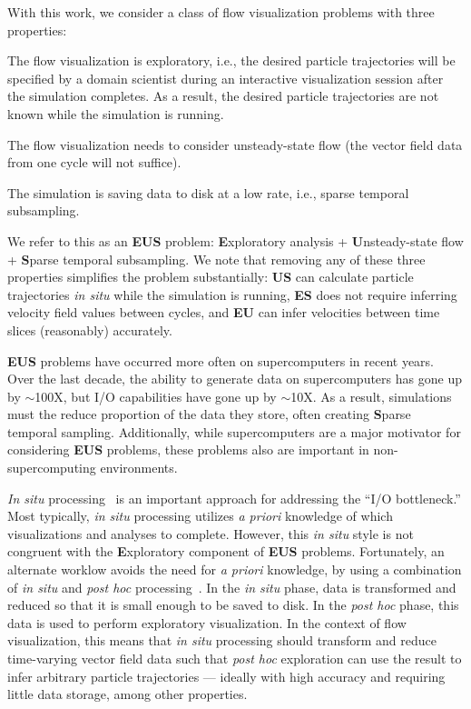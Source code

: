 With this work, we consider a class of flow visualization problems with three properties:
\begin{tightEnumerate}
\item The flow visualization is exploratory, i.e., the desired particle trajectories will 
be specified by a domain scientist during an interactive visualization session after the simulation completes.  
As a result, the desired particle trajectories are not known while the simulation is running.
\item The flow visualization needs to consider unsteady-state flow (the vector field data from one cycle will not suffice).
\item The simulation is saving data to disk at a low rate, i.e., sparse temporal subsampling.
\end{tightEnumerate}
%
We refer to this as an \textbf{EUS} problem: 
\textbf{E}xploratory analysis
+ 
\textbf{U}nsteady-state flow 
+ 
\textbf{S}parse temporal subsampling.
%
We note that removing any of these three properties simplifies the problem substantially:
\textbf{US} can calculate particle trajectories \textit{in situ} while the simulation is running,
\textbf{ES} does not require inferring velocity field values between cycles, 
and
\textbf{EU} can infer velocities between time slices (reasonably) accurately.

\textbf{EUS} problems have occurred more often on supercomputers in recent years.
%
Over the last decade, the ability to generate data on supercomputers has gone up by $\sim$100X, 
but I/O capabilities have gone up by $\sim$10X.
%
As a result, simulations must the reduce proportion of the data they store, 
often creating \textbf{S}parse temporal sampling.
%
Additionally, 
while supercomputers are a major motivator for considering \textbf{EUS} problems,
these problems also are important in non-supercomputing environments.

\textit{In situ} processing~\cite{ma2009situ, bauer2016situ}
is an important approach for addressing the ``I/O bottleneck.''
%
Most typically, 
\textit{in situ} processing utilizes 
\textit{a priori} knowledge of which visualizations and analyses to complete.
%
However, 
this \textit{in situ} style is not congruent with the \textbf{E}xploratory component of \textbf{EUS} problems.
%
Fortunately, an alternate worklow avoids the need for \textit{a priori} knowledge,
by using 
a combination of \textit{in situ} and \textit{post hoc} processing~\cite{JSFI78}.
%
In the \textit{in situ} phase, 
data is transformed and reduced so that it is small enough to be saved to
disk.
%
In the \textit{post hoc} phase, this data is used to perform
exploratory visualization.
%
In the context of flow visualization, this means that \textit{in situ} processing should transform
and reduce time-varying vector field data such that \textit{post hoc} exploration can use the result to
infer arbitrary particle trajectories ---
ideally with high accuracy and requiring little data storage, among
other properties.

